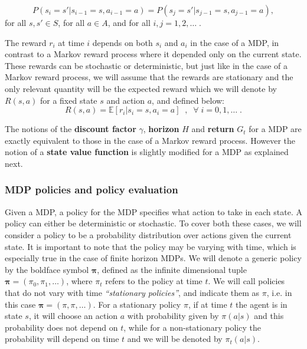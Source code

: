\documentclass{article}
\theoremstyle{definition}
\theoremstyle{remark}
\newcommand{\E}{\mathbb{E}}                                        %
\begin{document}
\begin{equation}
P(s_i = s' | s_{i-1} = s, a_{i-1} = a) = P(s_j = s' | s_{j-1} = s, a_{j-1} = a),
\label{eq:stationary_def_mdp}
\end{equation}
for all $s,s' \in S$, for all $a \in A$, and for all $i,j = 1,2,\dots \;$.

The reward $r_i$ at time $i$ depends on both $s_i$ and $a_i$ in the case of a MDP, in contrast to a Markov reward process where it depended only on the current state. These rewards can be stochastic or deterministic, but just like in the case of a Markov reward process, we will assume that the rewards are stationary and the only relevant quantity will be the expected reward which we will denote by $R(s,a)$ for a fixed state $s$ and action $a$, and defined below:
\begin{equation}
R(s,a) = \E[r_i|s_i = s, a_i = a] \;\;,\;\; \forall \; i = 0,1,\dots \;.
\label{eq:expexted_reward_func_mdp}
\end{equation}

The notions of the \textbf{discount factor} $\gamma$, \textbf{horizon} $H$ and \textbf{return} $G_t$ for a MDP are exactly equivalent to those in the case of a Markov reward process. However the notion of a \textbf{state value function} is slightly modified for a MDP as explained next.

\subsubsection{MDP policies and policy evaluation}
\label{MDP-MRP-equiv-subsubsection}
Given a MDP, a policy for the MDP specifies what action to take in each state. A policy can either be deterministic or stochastic. To cover both these cases, we will consider a policy to be a probability distribution over actions given the current state. It is important to note that the policy may be varying with time, which is especially true in the case of finite horizon MDPs. We will denote a generic policy by the boldface symbol $\bm{\pi}$, defined as the infinite dimensional tuple $\bm{\pi} = (\pi_0,\pi_1,\dots)$, where $\pi_t$ refers to the policy at time $t$. We will call policies that do not vary with time \textit{``stationary policies''}, and indicate them as $\pi$, i.e. in this case $\bm{\pi} = (\pi,\pi,\dots)$. For a stationary policy $\pi$, if at time $t$ the agent is in state $s$, it will choose an action $a$ with probability given by $\pi(a|s)$ and this probability does not depend on $t$, while for a non-stationary policy the probability will depend on time $t$ and we will be denoted by $\pi_t(a|s)$.
\end{document}
